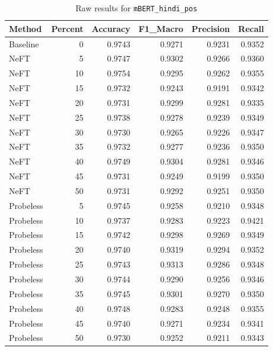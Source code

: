 \documentclass[12pt]{article}
\begin{document}
\begin{table}[H]
\centering
\caption{Raw results for \texttt{mBERT\_hindi\_pos}}
\label{tab:mbert-hindi-pos}
\begin{tabular}{lrrrrr}
\toprule
Method & Percent & Accuracy & F1\_Macro & Precision & Recall \\
\midrule
Baseline & 0 & 0.9743 & 0.9271 & 0.9231 & 0.9352 \\
NeFT & 5 & 0.9747 & 0.9302 & 0.9266 & 0.9360 \\
NeFT & 10 & 0.9754 & 0.9295 & 0.9262 & 0.9355 \\
NeFT & 15 & 0.9732 & 0.9243 & 0.9191 & 0.9342 \\
NeFT & 20 & 0.9731 & 0.9299 & 0.9281 & 0.9335 \\
NeFT & 25 & 0.9738 & 0.9278 & 0.9239 & 0.9349 \\
NeFT & 30 & 0.9730 & 0.9265 & 0.9226 & 0.9347 \\
NeFT & 35 & 0.9732 & 0.9277 & 0.9236 & 0.9350 \\
NeFT & 40 & 0.9749 & 0.9304 & 0.9281 & 0.9346 \\
NeFT & 45 & 0.9731 & 0.9249 & 0.9199 & 0.9350 \\
NeFT & 50 & 0.9731 & 0.9292 & 0.9251 & 0.9350 \\
Probeless & 5 & 0.9745 & 0.9258 & 0.9210 & 0.9348 \\
Probeless & 10 & 0.9737 & 0.9283 & 0.9223 & 0.9421 \\
Probeless & 15 & 0.9742 & 0.9298 & 0.9269 & 0.9349 \\
Probeless & 20 & 0.9740 & 0.9319 & 0.9294 & 0.9352 \\
Probeless & 25 & 0.9743 & 0.9313 & 0.9286 & 0.9348 \\
Probeless & 30 & 0.9744 & 0.9290 & 0.9256 & 0.9346 \\
Probeless & 35 & 0.9745 & 0.9301 & 0.9270 & 0.9350 \\
Probeless & 40 & 0.9748 & 0.9283 & 0.9248 & 0.9355 \\
Probeless & 45 & 0.9740 & 0.9271 & 0.9234 & 0.9341 \\
Probeless & 50 & 0.9730 & 0.9252 & 0.9211 & 0.9343 \\
\bottomrule
\end{tabular}
\end{table}
\end{document}
